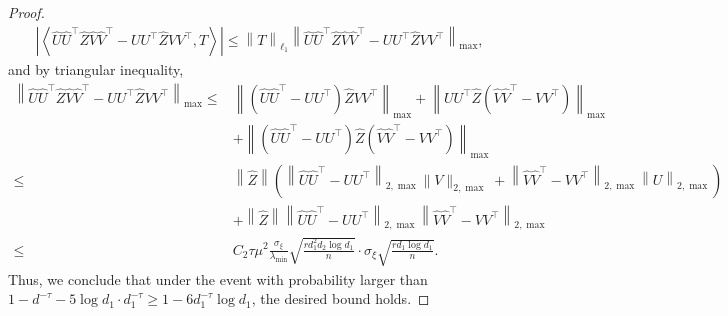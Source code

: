 \documentclass[12pt]{article}
\newcommand{\abs}[1]{\left\lvert#1\right\rvert}
\newcommand{\norm}[1]{\left\lVert#1\right\rVert}
\theoremstyle{plain}
\begin{document}
\begin{proof}
$$
\begin{aligned}
    \abs{\left\langle \widehat{U}\widehat{U}^\top \widehat{Z} \widehat{V}\widehat{V}^\top - UU^\top \widehat{Z}VV^\top, T \right\rangle} \le \norm{T}_{\ell_1} \norm{\widehat{U}\widehat{U}^\top \widehat{Z} \widehat{V}\widehat{V}^\top - UU^\top \widehat{Z}VV^\top}_{\max},
\end{aligned}
$$
and by triangular inequality,
$$
\begin{aligned}
    \norm{\widehat{U}\widehat{U}^\top \widehat{Z} \widehat{V}\widehat{V}^\top - UU^\top \widehat{Z}VV^\top}_{\max} \le  &   \norm{ (\widehat{U}\widehat{U}^\top-UU^\top) \widehat{Z}VV^\top}_{\max} + \norm{ UU^\top \widehat{Z}( \widehat{V}\widehat{V}^\top -VV^\top)}_{\max} \\
    &+  \norm{ (\widehat{U}\widehat{U}^\top-UU^\top)  \widehat{Z} ( \widehat{V}\widehat{V}^\top- VV^\top)}_{\max}\\
    \le & \left\|\widehat{Z}\right\| \left(\left\|\widehat{U} \widehat{U}^{\top}-U U^{\top}\right\|_{2,  { \max }}\|V\|_{2, { \max }} +\norm{\widehat{V}\widehat{V}^\top- VV^\top}_{2,\max} \norm{U}_{2, { \max }} \right) \\
    & + \left\|\widehat{Z}\right\| \left\|\widehat{U} \widehat{U}^{\top}-U U^{\top}\right\|_{2,  { \max }}\norm{\widehat{V}\widehat{V}^\top- VV^\top}_{2,\max} \\
    \le & C_2 \tau\mu^2 \frac{\sigma_{\xi}}{\lambda_{\min}} \sqrt{\frac{r d_1^2 d_2 \log d_1}{n}} \cdot \sigma_{\xi} \sqrt{\frac{r d_1 \log d_1}{n}}.
\end{aligned}
$$
Thus, we conclude that under the event with probability larger than $1-d^{-\tau}-5\log d_1 \cdot d_1^{-\tau}\ge 1-6 d_1^{-\tau}\log d_1$, the desired bound holds.
\end{proof}
\end{document}
